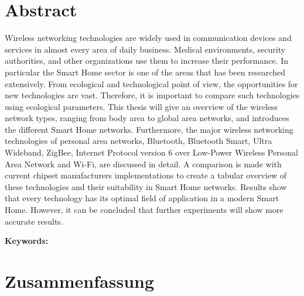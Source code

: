 \documentclass[
  headexclude,
  footexclude,
  10pt,
  a4paper,
  oneside,
  captions=tableheading,
  bibliography=totoc,
  listof=totoc
]{scrbook}
\begin{document}

\chapter*{Abstract}

Wireless networking technologies are widely used in communication devices and services in almost every area of daily business. Medical environments, security authorities, and other organizations use them to increase their performance. In particular the Smart Home sector is one of the areas that has been researched extensively. From ecological and technological point of view, the opportunities for new technologies are vast. Therefore, it is important to compare such technologies using ecological parameters. This thesis will give an overview of the wireless network types, ranging from body area to global area networks, and introduces the different Smart Home networks. Furthermore, the major wireless networking technologies of personal area networks, Bluetooth, Bluetooth Smart, Ultra Wideband, ZigBee, Internet Protocol version 6 over Low-Power Wireless Personal Area Network and Wi-Fi, are discussed in detail. A comparison is made with current chipset manufacturers implementations to create a tabular overview of these technologies and their suitability in Smart Home networks. Results show that every technology has its optimal field of application in a modern Smart Home. However, it can be concluded that further experiments will show more accurate results.

\vspace{2cm}

\textbf{Keywords:} \campusKeywords

\chapter*{Zusammenfassung}
\end{document}
